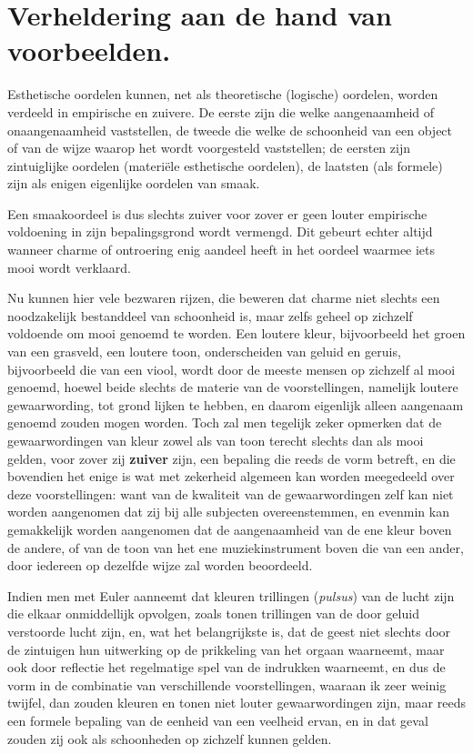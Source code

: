 \section{Verheldering aan de hand van voorbeelden.}

Esthetische oordelen kunnen, net als theoretische (logische) oordelen, worden verdeeld in empirische en zuivere. De eerste zijn die welke aangenaamheid of onaangenaamheid vaststellen, de tweede die welke de schoonheid van een object of van de wijze waarop het wordt voorgesteld vaststellen; de eersten zijn zintuiglijke oordelen (materiële esthetische oordelen), de laatsten (als formele) zijn als enigen eigenlijke oordelen van smaak.

Een smaakoordeel is dus slechts zuiver voor zover er geen louter empirische voldoening in zijn bepalingsgrond wordt vermengd. Dit gebeurt echter altijd wanneer charme of ontroering enig aandeel heeft in het oordeel waarmee iets mooi wordt verklaard.

Nu kunnen hier vele bezwaren rijzen, die beweren dat charme niet slechts een noodzakelijk bestanddeel van schoonheid is, maar zelfs geheel op zichzelf voldoende om mooi genoemd te worden. Een loutere kleur, bijvoorbeeld het groen van een grasveld, een loutere toon, onderscheiden van geluid en geruis, bijvoorbeeld die van een viool, wordt door de meeste mensen op zichzelf al mooi genoemd, hoewel beide slechts de materie van de voorstellingen, namelijk loutere gewaarwording, tot grond lijken te hebben, en daarom eigenlijk alleen aangenaam genoemd zouden mogen worden. Toch zal men tegelijk zeker opmerken dat de gewaarwordingen van kleur zowel als van toon terecht slechts dan als mooi gelden, voor zover zij \textbf{zuiver} zijn, een bepaling die reeds de vorm betreft, en die bovendien het enige is wat met zekerheid algemeen kan worden meegedeeld over deze voorstellingen: want van de kwaliteit van de gewaarwordingen zelf kan niet worden aangenomen dat zij bij alle subjecten overeenstemmen, en evenmin kan gemakkelijk worden aangenomen dat de aangenaamheid van de ene kleur boven de andere, of van de toon van het ene muziekinstrument boven die van een ander, door iedereen op dezelfde wijze zal worden beoordeeld.

Indien men met Euler aanneemt dat kleuren trillingen (\emph{pulsus}) van de lucht zijn die elkaar onmiddellijk opvolgen, zoals tonen trillingen van de door geluid verstoorde lucht zijn, en, wat het belangrijkste is, dat de geest niet slechts door de zintuigen hun uitwerking op de prikkeling van het orgaan waarneemt, maar ook door reflectie het regelmatige spel van de indrukken waarneemt, en dus de vorm in de combinatie van verschillende voorstellingen, waaraan ik zeer weinig twijfel, dan zouden kleuren en tonen niet louter gewaarwordingen zijn, maar reeds een formele bepaling van de eenheid van een veelheid ervan, en in dat geval zouden zij ook als schoonheden op zichzelf kunnen gelden.

